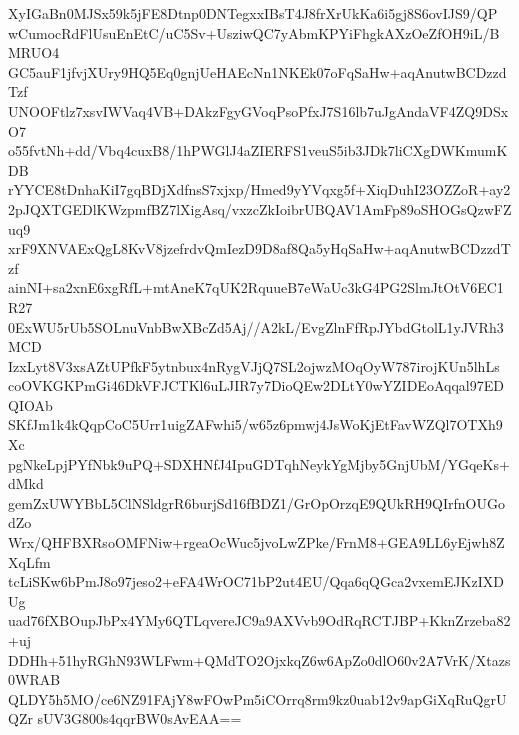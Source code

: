 XyIGaBn0MJSx59k5jFE8Dtnp0DNTegxxIBsT4J8frXrUkKa6i5gj8S6ovIJS9/QP
wCumocRdFlUsuEnEtC/uC5Sv+UsziwQC7yAbmKPYiFhgkAXzOeZfOH9iL/BMRUO4
GC5auF1jfvjXUry9HQ5Eq0gnjUeHAEcNn1NKEk07oFqSaHw+aqAnutwBCDzzdTzf
UNOOFtlz7xsvIWVaq4VB+DAkzFgyGVoqPsoPfxJ7S16lb7uJgAndaVF4ZQ9DSxO7
o55fvtNh+dd/Vbq4cuxB8/1hPWGlJ4aZIERFS1veuS5ib3JDk7liCXgDWKmumKDB
rYYCE8tDnhaKiI7gqBDjXdfnsS7xjxp/Hmed9yYVqxg5f+XiqDuhI23OZZoR+ay2
2pJQXTGEDlKWzpmfBZ7lXigAsq/vxzcZkIoibrUBQAV1AmFp89oSHOGsQzwFZuq9
xrF9XNVAExQgL8KvV8jzefrdvQmIezD9D8af8Qa5yHqSaHw+aqAnutwBCDzzdTzf
ainNI+sa2xnE6xgRfL+mtAneK7qUK2RquueB7eWaUc3kG4PG2SlmJtOtV6EC1R27
0ExWU5rUb5SOLnuVnbBwXBcZd5Aj//A2kL/EvgZlnFfRpJYbdGtolL1yJVRh3MCD
IzxLyt8V3xsAZtUPfkF5ytnbux4nRygVJjQ7SL2ojwzMOqOyW787irojKUn5lhLs
coOVKGKPmGi46DkVFJCTKl6uLJIR7y7DioQEw2DLtY0wYZIDEoAqqal97EDQIOAb
SKfJm1k4kQqpCoC5Urr1uigZAFwhi5/w65z6pmwj4JsWoKjEtFavWZQl7OTXh9Xc
pgNkeLpjPYfNbk9uPQ+SDXHNfJ4IpuGDTqhNeykYgMjby5GnjUbM/YGqeKs+dMkd
gemZxUWYBbL5ClNSldgrR6burjSd16fBDZ1/GrOpOrzqE9QUkRH9QIrfnOUGodZo
Wrx/QHFBXRsoOMFNiw+rgeaOcWuc5jvoLwZPke/FrnM8+GEA9LL6yEjwh8ZXqLfm
tcLiSKw6bPmJ8o97jeso2+eFA4WrOC71bP2ut4EU/Qqa6qQGca2vxemEJKzIXDUg
uad76fXBOupJbPx4YMy6QTLqvereJC9a9AXVvb9OdRqRCTJBP+KknZrzeba82+uj
DDHh+51hyRGhN93WLFwm+QMdTO2OjxkqZ6w6ApZo0dlO60v2A7VrK/Xtazs0WRAB
QLDY5h5MO/ce6NZ91FAjY8wFOwPm5iCOrrq8rm9kz0uab12v9apGiXqRuQgrUQZr
sUV3G800s4qqrBW0sAvEAA==
